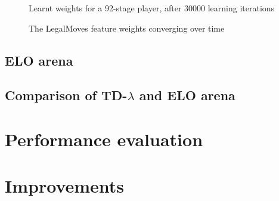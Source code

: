\documentclass[11pt,twocolumn]{article}
\newcommand{\tdl}{TD-$\lambda$ }
\begin{document}
\begin{figure}[H]\centering
    \caption{Learnt weights for a 92-stage player, after 30000 learning iterations} 
    \label{WeightsOverTime92}
\end{figure}

\begin{figure}[H]\centering
    \caption{The LegalMoves feature weights converging over time} 
    \label{LegalMovesConvergence}
\end{figure}
\clearpage
\subsection{ELO arena}
\subsection{Comparison of \tdl and ELO arena}
\section{Performance evaluation}
\section{Improvements}




\end{document}
